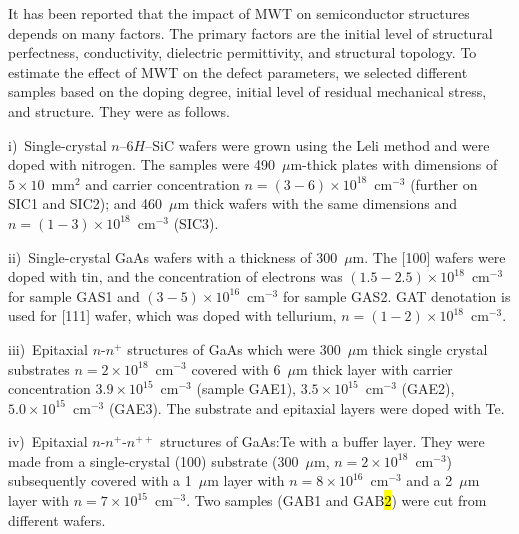 \documentclass[10pt]{iopart}
\begin{document}
It has been reported \cite{BoltovetsEn,Milenin1994En,BelyaevIntac,ASHKINADZE1996,ProcSPIE} that
the impact of MWT on semiconductor structures depends on many factors.
The primary factors are the initial level of structural perfectness, conductivity, dielectric permittivity, and structural topology.
To estimate the effect of MWT on the defect parameters, we selected different samples based on the doping degree, initial level of residual mechanical stress, and structure.
They were as follows.

\noindent
i)~Single-crystal $n$--6$H$--SiC wafers were grown using the Leli method and were doped with nitrogen.
   The samples were  490~$\mu$m-thick plates with dimensions of $5\times10$~mm$^2$ and  carrier concentration $n=(3-6)\times10^{18}$~cm$^{-3}$
    (further on SIC1 and SIC2);
    and 460~$\mu$m thick wafers with the same dimensions and $n=(1-3)\times10^{18}$~cm$^{-3}$ (SIC3).

\noindent
ii)~Single-crystal GaAs  wafers with a thickness of 300~$\mu$m.
   The [100] wafers were  doped with tin, and the concentration of electrons was $(1.5-2.5)\times10^{18}$~cm$^{-3}$
   for sample  GAS1 and $(3-5)\times10^{16}$~cm$^{-3}$ for sample GAS2.
   GAT denotation is used for [111] wafer, which was doped with tellurium,
   $n = (1-2)\times10^{18}$~cm$^{-3}$.

\noindent
iii)~Epitaxial $n$-$n^+$ structures of GaAs which were 300~$\mu$m thick single crystal substrates $n = 2 \times10^{18}$~cm$^{-3}$
   covered with 6~$\mu$m thick layer with carrier concentration $3.9\times10^{15}$~cm$^{-3}$
   (sample GAE1), $3.5\times10^{15}$~cm$^{-3}$ (GAE2),
   $5.0\times10^{15}$~cm$^{-3}$ (GAE3).
   The substrate and epitaxial layers were doped with Te.

\noindent
iv)~Epitaxial $n$-$n^+$-$n^{++}$ structures of GaAs:Te with a buffer layer.
 They were made from a single-crystal (100) substrate (300~$\mu$m, $n= 2\times10^{18}$~cm$^{-3}$)
  subsequently covered with a 1~$\mu$m layer with $n=8\times10^{16}$~cm$^{-3}$ and
  a 2~$\mu$m layer with $n=7\times10^{15}$~cm$^{-3}$.
  Two samples (GAB1 and GAB\hl{2}) were cut from different wafers.
\end{document}
